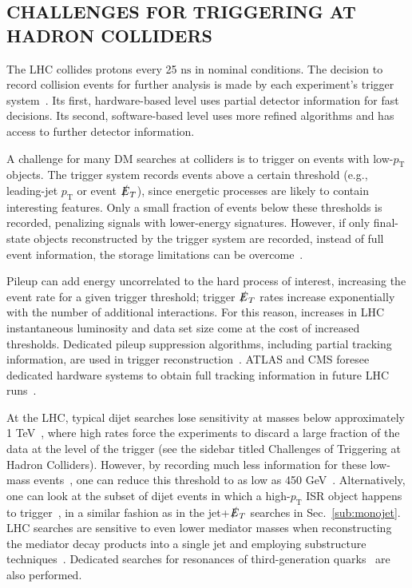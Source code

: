 \documentclass{ar-1col}
\newcommand{\pt}{\ensuremath{p_\mathrm{T}}\xspace}
\newcommand{\MET}{\ensuremath{\slashed{E}_T}\xspace}
\begin{document}
\begin{textbox}
\section{CHALLENGES FOR TRIGGERING AT HADRON COLLIDERS}

\noindent The LHC collides protons every 25 $\mathrm{ns}$ in nominal
conditions. The decision to record collision events for further
analysis is made by each experiment's trigger
system~\cite{Smith:2016vcs,Aaboud:2016leb,Khachatryan:2016bia,Aaij:2012me}.
Its first, hardware-based level uses partial detector information
for fast decisions. Its second, software-based level uses more
refined algorithms and has access to further detector information.

A challenge for many DM searches at colliders is to trigger on events with low-\pt objects.  
The trigger system records events above a certain threshold (e.g., leading-jet \pt or event
\MET), since energetic processes are likely to contain interesting
features. Only a small fraction of events below these thresholds
is recorded, penalizing signals with lower-energy signatures.
However, if only final-state objects reconstructed by the trigger
system are recorded, instead of full event information, the
storage limitations can be
overcome~\cite{Aaij:2016rxn,Khachatryan:2016ecr,Aaboud:2018fzt}.

Pileup can add energy uncorrelated to the hard process of interest, increasing the event
rate for a given trigger threshold; trigger \MET rates increase
exponentially with the number of additional interactions. For this
reason, increases in LHC instantaneous luminosity and data set size
come at the cost of increased thresholds. Dedicated pileup
suppression algorithms, including partial tracking information, are
used in trigger
reconstruction~\cite{CMS:2014ata,ATLAS-CONF-2014-019}. ATLAS and
CMS foresee dedicated hardware systems to obtain full tracking
information in future LHC
runs~\cite{Shochet:2013gaw,1748-0221-6-12-C12065}.
\end{textbox}

At the LHC, typical dijet searches lose sensitivity at masses
below approximately 1 TeV~\cite{An:2012ue,Dobrescu:2013coa}, where high
rates force the experiments to discard a large fraction of the
data at the level of the trigger (see the sidebar titled Challenges of Triggering at Hadron Colliders). 
However, by recording much less
information for these low-mass
events~\cite{Khachatryan:2016ecr,Aaboud:2016leb}, 
one can reduce this threshold to as low as 450
GeV~\cite{Sirunyan:2018xlo,Aaboud:2018fzt}.  
Alternatively, one can look at the subset of dijet events in which a
high-\pt{} ISR object happens to
trigger~\cite{ATLAS:2016bvn,Sirunyan:2017nvi}, in a similar fashion as in
the jet+\MET searches in Sec.~\ref{sub:monojet}. 
LHC searches are sensitive to even lower mediator masses when
reconstructing the mediator decay products into a single jet and
employing substructure techniques~\cite{Sirunyan:2017nvi,Aaboud:2018zba}. 
Dedicated searches for resonances of third-generation
quarks~\cite{lowMassDiB,CMS-PAS-HIG-16-025,Aaboud:2017hnm} are
also performed.
\end{document}
